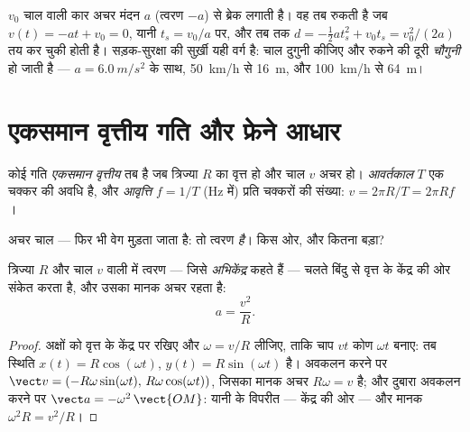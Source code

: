 \begin{example}[रुकने की दूरी]\label{ex:g12:kinematics-2d:braking}
$v_0$ चाल वाली कार अचर मंदन $a$ (त्वरण $-a$) से ब्रेक लगाती
है। वह तब रुकती है जब $v(t) = -a t + v_0 = 0$, यानी $t_s = v_0/a$ पर, और तब तक $d = -\tfrac12 a t_s^2 + v_0 t_s =
v_0^2/(2a)$ तय कर चुकी
होती है। सड़क-सुरक्षा की सुर्ख़ी यही वर्ग है: चाल दुगुनी कीजिए और
रुकने की दूरी \emph{चौगुनी} हो जाती है --- $a =
\qty{6.0}{m/s^2}$ के साथ, \qty{50}{km/h} से
\qty{16}{m}, और \qty{100}{km/h} से \qty{64}{m}।
\end{example}

\section{एकसमान वृत्तीय गति और फ्रेने आधार}

\begin{definition}[एकसमान वृत्तीय गति]\label{def:g12:kinematics-2d:ucm}
कोई गति \emph{एकसमान वृत्तीय} तब है जब
 त्रिज्या $R$ का वृत्त हो और चाल $v$ अचर हो।
\emph{आवर्तकाल} $T$ एक चक्कर की अवधि है, और
\emph{आवृत्ति} $f = 1/T$ (\unit{Hz} में) प्रति 
चक्करों की संख्या: $v = 2\pi R/T = 2\pi R f$।
\end{definition}

अचर चाल --- फिर भी वेग मुड़ता जाता है: तो त्वरण \emph{है}। किस ओर, और
कितना बड़ा?

\begin{theorem}[अभिकेंद्र त्वरण]\label{thm:g12:kinematics-2d:centripetal}
%
त्रिज्या $R$ और चाल $v$ वाली  में
त्वरण --- जिसे \emph{अभिकेंद्र} कहते हैं --- चलते बिंदु से वृत्त के केंद्र की
ओर संकेत करता है, और उसका मानक अचर रहता है:
\[
a = \frac{v^2}{R}.
\]
\end{theorem}

\begin{proof}
अक्षों को वृत्त के केंद्र पर रखिए और $\omega = v/R$ लीजिए, ताकि चाप $v t$ कोण
$\omega t$ बनाए: तब स्थिति $x(t) = R\cos(\omega t)$, $y(t) = R\sin(\omega t)$ है। अवकलन करने पर $\vect v = (-R\omega\sin(\omega t),\, R\omega\cos(\omega t))$, जिसका
मानक अचर $R\omega = v$ है; और दुबारा अवकलन करने पर $\vect a = -\omega^2\,\vect{OM}$: यानी  के विपरीत --- केंद्र की ओर --- और मानक $\omega^2 R = v^2/R$।
\end{proof}

